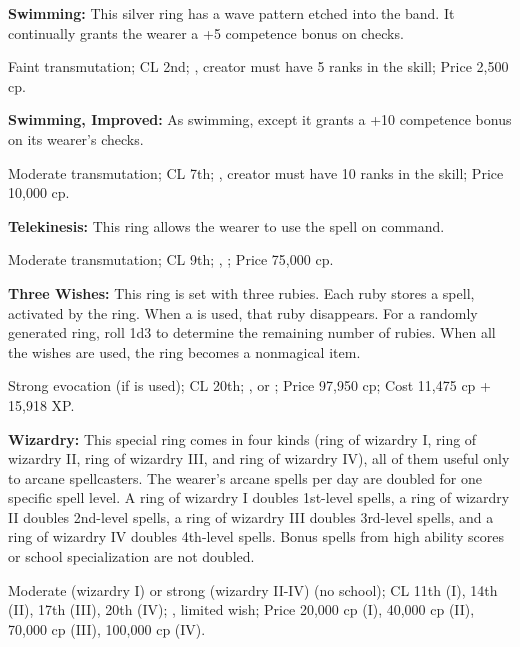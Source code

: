 
\textbf{Swimming:} This silver ring has a wave pattern etched into the band. It continually grants the wearer a +5 competence bonus on  checks.

Faint transmutation; CL 2nd; , creator must have 5 ranks in the  skill; Price 2,500 cp.

\textbf{Swimming, Improved:} As swimming, except it grants a +10 competence bonus on its wearer's  checks.

Moderate transmutation; CL 7th; , creator must have 10 ranks in the  skill; Price 10,000 cp.

\textbf{Telekinesis:} This ring allows the wearer to use the spell  on command.

Moderate transmutation; CL 9th; , ; Price 75,000 cp.

\textbf{Three Wishes:} This ring is set with three rubies. Each ruby stores a  spell, activated by the ring. When a  is used, that ruby disappears. For a randomly generated ring, roll 1d3 to determine the remaining number of rubies. When all the wishes are used, the ring becomes a nonmagical item.

Strong evocation (if  is used); CL 20th; ,  or ; Price 97,950 cp; Cost 11,475 cp + 15,918 XP.



\textbf{Wizardry:} This special ring comes in four kinds (ring of wizardry I, ring of wizardry II, ring of wizardry III, and ring of wizardry IV), all of them useful only to arcane spellcasters. The wearer's arcane spells per day are doubled for one specific spell level. A ring of wizardry I doubles 1st-level spells, a ring of wizardry II doubles 2nd-level spells, a ring of wizardry III doubles 3rd-level spells, and a ring of wizardry IV doubles 4th-level spells. Bonus spells from high ability scores or school specialization are not doubled.

Moderate (wizardry I) or strong (wizardry II-IV) (no school); CL 11th (I), 14th (II), 17th (III), 20th (IV); , limited wish; Price 20,000 cp (I), 40,000 cp (II), 70,000 cp (III), 100,000 cp (IV).

